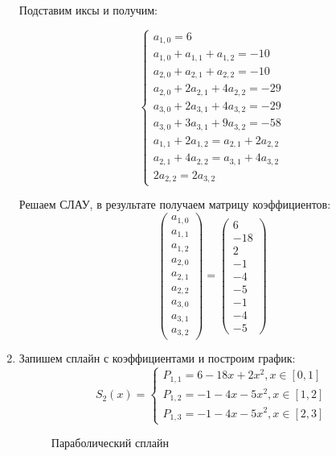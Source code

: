 \documentclass[a4paper,12pt]{article} %
\begin{document}
\begin{enumerate}
Подставим иксы и получим:

\begin{equation*}
    \begin{cases}
        a_{1, 0} = 6 \\
        a_{1, 0} + a_{1, 1} + a_{1, 2} = -10 \\
        a_{2, 0} + a_{2, 1} + a_{2, 2} = -10 \\
        a_{2, 0} + 2a_{2, 1} + 4a_{2, 2} = -29 \\
        a_{3, 0} + 2a_{3, 1} + 4a_{3, 2} = -29 \\
        a_{3, 0} + 3a_{3, 1} + 9a_{3, 2} = -58 \\
        a_{1, 1} + 2a_{1, 2} = a_{2, 1} + 2a_{2, 2} \\
        a_{2, 1} + 4a_{2, 2} = a_{3, 1} + 4a_{3, 2} \\
        2a_{2, 2} = 2a_{3, 2}
    \end{cases}
\end{equation*}

Решаем СЛАУ, в результате получаем матрицу коэффициентов:
\begin{equation*}
    \left(\begin{matrix}
        a_{1, 0} \\
        a_{1, 1} \\
        a_{1, 2} \\
        a_{2, 0} \\
        a_{2, 1} \\
        a_{2, 2} \\
        a_{3, 0} \\
        a_{3, 1} \\
        a_{3, 2} 
    \end{matrix}\right)
    =
    \left(\begin{matrix}
        6 \\
        -18 \\
        2 \\
        -1 \\
        -4 \\
        -5 \\
        -1 \\
        -4 \\
        -5
    \end{matrix}\right)
\end{equation*}

\item Запишем сплайн с коэффициентами и построим график:
\begin{equation*}
    S_2(x) =
    \begin{cases}
        P_{1, 1} = 6 - 18x + 2x^2, x \in [0, 1]\\
        P_{1, 2} = -1 - 4x - 5x^2, x \in [1, 2]\\
        P_{1, 3} = -1 - 4x - 5x^2, x \in [2, 3]
    \end{cases}
\end{equation*}

\newpage

\begin{figure}[h]
    \caption{Параболический сплайн}
\label{fig:image}
\end{figure}


\end{enumerate}
\end{document}

